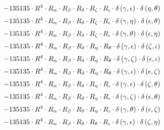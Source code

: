 \begin{subequations}
\begin{gather}
 \\[0.2em] \notag 		 - 135135 \cdot R^{4} \cdot R_{\alpha{}} \cdot R_{\beta{}} \cdot R_{\delta{}} \cdot R_{\zeta{}} \cdot R_{\iota{}} \cdot \delta{}\left(\gamma{}, \epsilon{}\right) \cdot \delta{}\left(\eta{}, \theta{}\right) 
 \\[0.2em] \notag 		 - 135135 \cdot R^{4} \cdot R_{\alpha{}} \cdot R_{\beta{}} \cdot R_{\delta{}} \cdot R_{\zeta{}} \cdot R_{\iota{}} \cdot \delta{}\left(\gamma{}, \eta{}\right) \cdot \delta{}\left(\epsilon{}, \theta{}\right) 
 \\[0.2em] \notag 		 - 135135 \cdot R^{4} \cdot R_{\alpha{}} \cdot R_{\beta{}} \cdot R_{\delta{}} \cdot R_{\zeta{}} \cdot R_{\iota{}} \cdot \delta{}\left(\gamma{}, \theta{}\right) \cdot \delta{}\left(\epsilon{}, \eta{}\right) 
 \\[0.2em] \notag 		 - 135135 \cdot R^{4} \cdot R_{\alpha{}} \cdot R_{\beta{}} \cdot R_{\delta{}} \cdot R_{\eta{}} \cdot R_{\theta{}} \cdot \delta{}\left(\gamma{}, \epsilon{}\right) \cdot \delta{}\left(\zeta{}, \iota{}\right) 
 \\[0.2em] \notag 		 - 135135 \cdot R^{4} \cdot R_{\alpha{}} \cdot R_{\beta{}} \cdot R_{\delta{}} \cdot R_{\eta{}} \cdot R_{\theta{}} \cdot \delta{}\left(\gamma{}, \zeta{}\right) \cdot \delta{}\left(\epsilon{}, \iota{}\right) 
 \\[0.2em] \notag 		 - 135135 \cdot R^{4} \cdot R_{\alpha{}} \cdot R_{\beta{}} \cdot R_{\delta{}} \cdot R_{\eta{}} \cdot R_{\theta{}} \cdot \delta{}\left(\gamma{}, \iota{}\right) \cdot \delta{}\left(\epsilon{}, \zeta{}\right) 
 \\[0.2em] \notag 		 - 135135 \cdot R^{4} \cdot R_{\alpha{}} \cdot R_{\beta{}} \cdot R_{\delta{}} \cdot R_{\eta{}} \cdot R_{\iota{}} \cdot \delta{}\left(\gamma{}, \epsilon{}\right) \cdot \delta{}\left(\zeta{}, \theta{}\right) 
 \\[0.2em] \notag 		 - 135135 \cdot R^{4} \cdot R_{\alpha{}} \cdot R_{\beta{}} \cdot R_{\delta{}} \cdot R_{\eta{}} \cdot R_{\iota{}} \cdot \delta{}\left(\gamma{}, \zeta{}\right) \cdot \delta{}\left(\epsilon{}, \theta{}\right) 
 \\[0.2em] \notag 		 - 135135 \cdot R^{4} \cdot R_{\alpha{}} \cdot R_{\beta{}} \cdot R_{\delta{}} \cdot R_{\eta{}} \cdot R_{\iota{}} \cdot \delta{}\left(\gamma{}, \theta{}\right) \cdot \delta{}\left(\epsilon{}, \zeta{}\right) 
 \\[0.2em] \notag 		 - 135135 \cdot R^{4} \cdot R_{\alpha{}} \cdot R_{\beta{}} \cdot R_{\delta{}} \cdot R_{\theta{}} \cdot R_{\iota{}} \cdot \delta{}\left(\gamma{}, \epsilon{}\right) \cdot \delta{}\left(\zeta{}, \eta{}\right) 

\end{gather}
\end{subequations}
